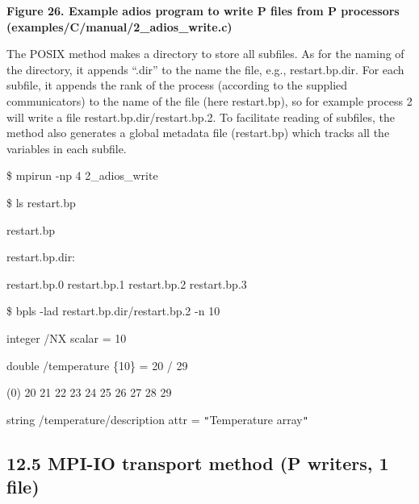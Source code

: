 \label{HRef119579429}\label{HToc144350185}

\vspace{22pt}
\begin{center}
{\color{color20} \textbf{Figure 26. Example adios program to write P files from 
P processors (examples/C/manual/2\_adios\_write.c)}}
\end{center}

\vspace{10pt}
The POSIX method makes a directory to store all subfiles. As for the naming of 
the directory, it appends ``.dir'' to the name the file, e.g., restart.bp.dir. 
For each subfile, it appends the rank of the process (according to the supplied 
communicators) to the name of the file (here restart.bp), so for example process 
2 will write a file restart.bp.dir/restart.bp.2. To facilitate reading of subfiles, 
the method also generates a global metadata file (restart.bp) which tracks all 
the variables in each subfile. 

\vspace{10pt}
\$ mpirun -np 4 2\_adios\_write

\vspace{22pt}
\$ ls restart.bp

\vspace{10pt}
restart.bp

\vspace{22pt}
restart.bp.dir:

\vspace{10pt}
restart.bp.0  restart.bp.1  restart.bp.2  restart.bp.3

\vspace{22pt}
\$ bpls -lad restart.bp.dir/restart.bp.2 -n 10

\vspace{10pt}
\parindent=7pt
integer    /NX                       scalar = 10 

\vspace{10pt}
double     /temperature              \{10\} = 20 / 29 

\vspace{10pt}
\parindent=14pt
(0)    20 21 22 23 24 25 26 27 28 29 

\vspace{22pt}
\parindent=0pt
string     /temperature/description  attr   = \texttt{"}Temperature array\texttt{"}\label{HToc84890296}\label{HToc212016672}\label{HToc212016914}\label{HToc182553444}

\vspace{22pt}
\subsection*{{\large 12.5 }{\large \textbf{MPI-IO transport method (P writers, 
1 file)}}}

